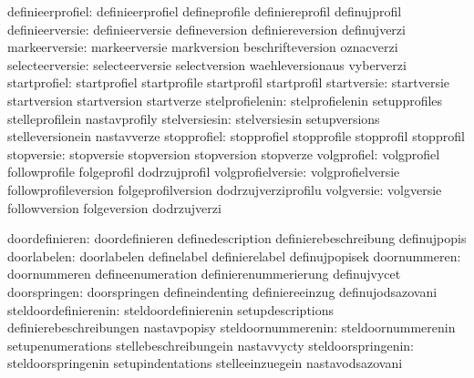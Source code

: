              definieerprofiel:  definieerprofiel             defineprofile
                                definiereprofil              definujprofil
              definieerversie:  definieerversie              defineversion
                                definiereversion             definujverzi
                markeerversie:  markeerversie                markversion
                                beschrifteversion            oznacverzi
              selecteerversie:  selecteerversie              selectversion
                                waehleversionaus             vyberverzi
                 startprofiel:  startprofiel                 startprofile
                                startprofil                  startprofil
                  startversie:  startversie                  startversion
                                startversion                 startverze
              stelprofielenin:  stelprofielenin              setupprofiles
                                stelleprofilein              nastavprofily
                stelversiesin:  stelversiesin                setupversions
                                stelleversionein             nastavverze
                  stopprofiel:  stopprofiel                  stopprofile
                                stopprofil                   stopprofil
                   stopversie:  stopversie                   stopversion
                                stopversion                  stopverze
                  volgprofiel:  volgprofiel                  followprofile
                                folgeprofil                  dodrzujprofil
            volgprofielversie:  volgprofielversie            followprofileversion
                                folgeprofilversion           dodrzujverziprofilu
                   volgversie:  volgversie                   followversion
                                folgeversion                 dodrzujverzi

               doordefinieren:  doordefinieren               definedescription
                                definierebeschreibung        definujpopis
                  doorlabelen:  doorlabelen                  definelabel
                                definierelabel               definujpopisek
                 doornummeren:  doornummeren                 defineenumeration
                                definierenummerierung        definujvycet
                 doorspringen:  doorspringen                 defineindenting
                                definiereeinzug              definujodsazovani
         steldoordefinierenin:  steldoordefinierenin         setupdescriptions
                                definierebeschreibungen      nastavpopisy
           steldoornummerenin:  steldoornummerenin           setupenumerations
                                stellebeschreibungein        nastavvycty
           steldoorspringenin:  steldoorspringenin           setupindentations
                                stelleeinzuegein             nastavodsazovani

